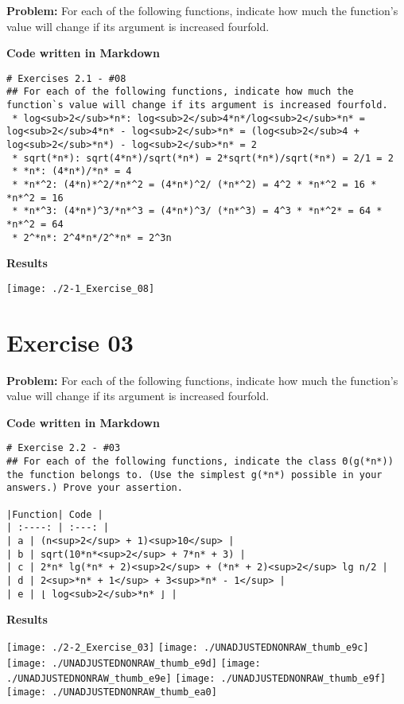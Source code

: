 \documentclass[paper=a4, fontsize=11pt]{scrartcl} %
\numberwithin{equation}{section}
\numberwithin{figure}{section}
\numberwithin{table}{section}
\begin{document}
\textbf{Problem:} For each of the following functions, indicate how much the function's value will change if its argument is increased fourfold.

\bigskip
\textbf{Code written in Markdown}
\begin{lstlisting}
# Exercises 2.1 - #08
## For each of the following functions, indicate how much the function`s value will change if its argument is increased fourfold.
 * log<sub>2</sub>*n*: log<sub>2</sub>4*n*/log<sub>2</sub>*n* = log<sub>2</sub>4*n* - log<sub>2</sub>*n* = (log<sub>2</sub>4 + log<sub>2</sub>*n*) - log<sub>2</sub>*n* = 2
 * sqrt(*n*): sqrt(4*n*)/sqrt(*n*) = 2*sqrt(*n*)/sqrt(*n*) = 2/1 = 2
 * *n*: (4*n*)/*n* = 4
 * *n*^2: (4*n)*^2/*n*^2 = (4*n*)^2/ (*n*^2) = 4^2 * *n*^2 = 16 * *n*^2 = 16
 * *n*^3: (4*n*)^3/*n*^3 = (4*n*)^3/ (*n*^3) = 4^3 * *n*^2* = 64 * *n*^2 = 64
 * 2^*n*: 2^4*n*/2^*n* = 2^3n
\end{lstlisting}

\textbf{Results}

\texttt{[image: ./2-1\_Exercise\_08]}
\pagebreak


\section{Exercise 03}

\textbf{Problem:} For each of the following functions, indicate how much the function's value will change if its argument is increased fourfold.

\bigskip
\textbf{Code written in Markdown}
\begin{lstlisting}
# Exercise 2.2 - #03
## For each of the following functions, indicate the class Θ(g(*n*)) the function belongs to. (Use the simplest g(*n*) possible in your answers.) Prove your assertion.

|Function| Code |
| :----: | :---: |
| a | (n<sup>2</sup> + 1)<sup>10</sup> |
| b | sqrt(10*n*<sup>2</sup> + 7*n* + 3) |
| c | 2*n* lg(*n* + 2)<sup>2</sup> + (*n* + 2)<sup>2</sup> lg n/2 |
| d | 2<sup>*n* + 1</sup> + 3<sup>*n* - 1</sup> |
| e | ⌊ log<sub>2</sub>*n* ⌋ |
\end{lstlisting}

\textbf{Results}

\texttt{[image: ./2-2\_Exercise\_03]}
\texttt{[image: ./UNADJUSTEDNONRAW\_thumb\_e9c]}
\texttt{[image: ./UNADJUSTEDNONRAW\_thumb\_e9d]}
\texttt{[image: ./UNADJUSTEDNONRAW\_thumb\_e9e]}
\texttt{[image: ./UNADJUSTEDNONRAW\_thumb\_e9f]}
\texttt{[image: ./UNADJUSTEDNONRAW\_thumb\_ea0]}
\end{document}
